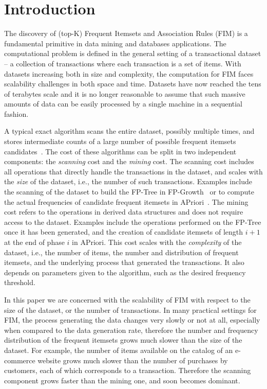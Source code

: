 \section{Introduction}\label{sec:parmaintro}
The discovery of (top-K) Frequent Itemsets and Association Rules (FIM)
is a fundamental primitive in data mining and databases applications. The
computational problem is defined in the general setting of a transactional dataset
-- a collection of transactions where each transaction is a set of items.
With datasets increasing both in size and complexity, the computation
for FIM faces scalability challenges in both space and time. 
%
Datasets have
now reached the tens of terabytes scale and it is no longer reasonable to assume
that such massive amounts of data can be easily processed by a single machine
in a sequential fashion. 
%

A typical exact algorithm scans the entire dataset,
possibly multiple times, and stores intermediate counts of a large number of
possible frequent itemsets candidates~\cite{AgrawalS94,HanPY00}. 
%
The cost of these algorithms can be split in two independent components:
the \emph{scanning} cost and the \emph{mining} cost. The scanning cost includes
all operations that directly handle the transactions in the dataset, and scales
with the \emph{size} of the dataset, i.e., the number of such transactions. Examples
include the scanning of the dataset to build the FP-Tree in
FP-Growth~\cite{HanPY00} or to compute the actual frequencies of candidate
frequent itemsets in APriori~\cite{AgrawalIS93}.  The mining cost refers to the
operations in derived data structures and does not require access to the
dataset. Examples include the operations performed on the FP-Tree once it has
been generated, and the creation of candidate itemsets of length $i+1$ at the
end of phase $i$ in APriori.  This cost scales with the \emph{complexity} of the
dataset, i.e., the number of items, the number and distribution of frequent
itemsets, and the underlying process that generated the transactions. It also
depends on parameters given to the algorithm, such as the desired frequency
threshold.

In this paper we are concerned with the scalability of FIM with respect to
the size of the dataset, or the number of transactions. 
In many practical settings for FIM, the process generating the data changes very
slowly or not at all, especially when compared to the data generation rate,
therefore the number and frequency distribution of the frequent itemsets grows
much slower than the size of the dataset. For example, the number of items
available on the catalog of an e-commerce website grows much slower than the
number of purchases by customers, each of which corresponds to a transaction.
Therefore the scanning component grows faster than the mining one, and soon
becomes dominant. 

